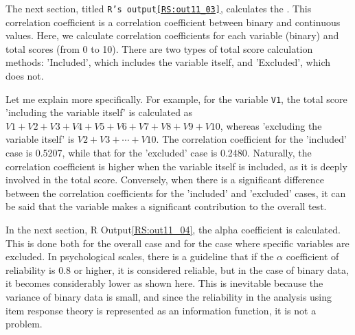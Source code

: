 \documentclass{ltjsbook}
\begin{document}
The next section, titled \texttt{R's output\ref{RS:out11_03}}, calculates the . This correlation coefficient is a correlation coefficient between binary and continuous values. Here, we calculate correlation coefficients for each variable (binary) and total scores (from 0 to 10). There are two types of total score calculation methods: 'Included', which includes the variable itself, and 'Excluded', which does not.

Let me explain more specifically. For example, for the variable \texttt{V1}, the total score 'including the variable itself' is calculated as $V1+V2+V3+V4+V5+V6+V7+V8+V9+V10$, whereas 'excluding the variable itself' is $V2+V3+\cdots+V10$. The correlation coefficient for the 'included' case is 0.5207, while that for the 'excluded' case is 0.2480. Naturally, the correlation coefficient is higher when the variable itself is included, as it is deeply involved in the total score. Conversely, when there is a significant difference between the correlation coefficients for the 'included' and 'excluded' cases, it can be said that the variable makes a significant contribution to the overall test.


In the next section, R Output\ref{RS:out11_04}, the alpha coefficient is calculated. This is done both for the overall case and for the case where specific variables are excluded.
In psychological scales, there is a guideline that if the $\alpha$ coefficient of reliability is 0.8 or higher, it is considered reliable, but in the case of binary data, it becomes considerably lower as shown here. This is inevitable because the variance of binary data is small, and since the reliability in the analysis using item response theory is represented as an information function, it is not a problem.

\end{document}
